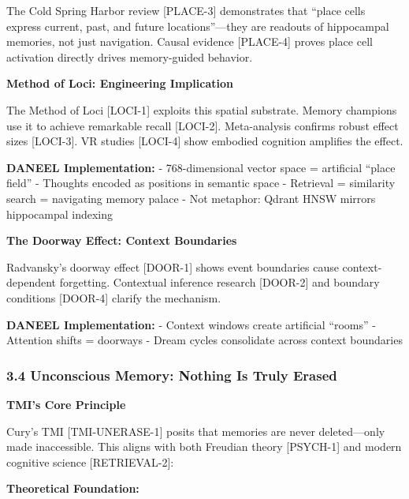 \documentclass[
]{article}
\begin{document}
The Cold Spring Harbor review {[}PLACE-3{]} demonstrates that ``place
cells express current, past, and future locations''---they are readouts
of hippocampal memories, not just navigation. Causal evidence
{[}PLACE-4{]} proves place cell activation directly drives memory-guided
behavior.

\textbf{Method of Loci: Engineering Implication}

The Method of Loci {[}LOCI-1{]} exploits this spatial substrate. Memory
champions use it to achieve remarkable recall {[}LOCI-2{]}.
Meta-analysis confirms robust effect sizes {[}LOCI-3{]}. VR studies
{[}LOCI-4{]} show embodied cognition amplifies the effect.

\textbf{DANEEL Implementation:} - 768-dimensional vector space =
artificial ``place field'' - Thoughts encoded as positions in semantic
space - Retrieval = similarity search = navigating memory palace - Not
metaphor: Qdrant HNSW mirrors hippocampal indexing

\textbf{The Doorway Effect: Context Boundaries}

Radvansky's doorway effect {[}DOOR-1{]} shows event boundaries cause
context-dependent forgetting. Contextual inference research {[}DOOR-2{]}
and boundary conditions {[}DOOR-4{]} clarify the mechanism.

\textbf{DANEEL Implementation:} - Context windows create artificial
``rooms'' - Attention shifts = doorways - Dream cycles consolidate
across context boundaries

\hypertarget{unconscious-memory-nothing-is-truly-erased}{%
\subsubsection{3.4 Unconscious Memory: Nothing Is Truly
Erased}\label{unconscious-memory-nothing-is-truly-erased}}

\textbf{TMI's Core Principle}

Cury's TMI {[}TMI-UNERASE-1{]} posits that memories are never
deleted---only made inaccessible. This aligns with both Freudian theory
{[}PSYCH-1{]} and modern cognitive science {[}RETRIEVAL-2{]}:

\textbf{Theoretical Foundation:}
\end{document}
